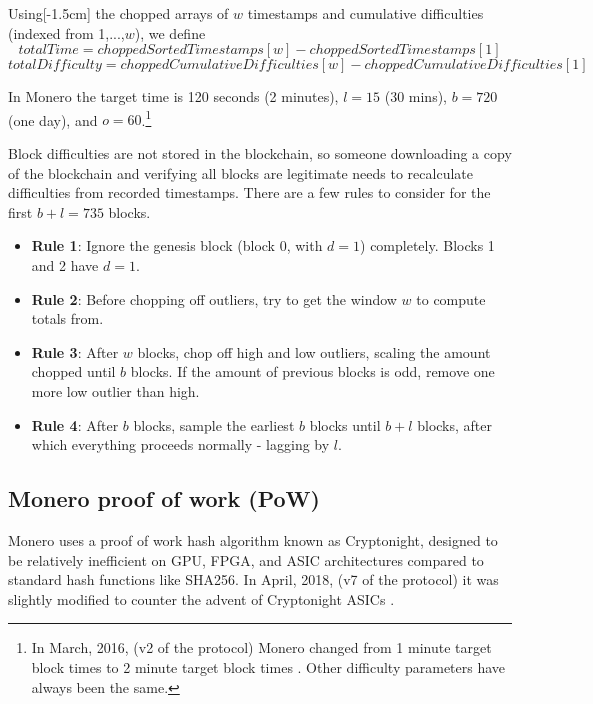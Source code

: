 Using[-1.5cm] the chopped arrays of $w$ timestamps and cumulative difficulties (indexed from 1,...,$w$), we define
\[ \mathit{totalTime} = \mathit{choppedSortedTimestamps}[w] - \mathit{choppedSortedTimestamps}[1]\]
\[ \mathit{totalDifficulty} = \mathit{choppedCumulativeDifficulties}[w] - \mathit{choppedCumulativeDifficulties}[1]\]

In Monero the target time is 120 seconds (2 minutes), $l = 15$ (30 mins), $b = 720$ (one day), and $o = 60$.\footnote{In March, 2016, (v2 of the protocol) Monero changed from 1 minute target block times to 2 minute target block times \cite{monero-0.9.3}. Other difficulty parameters have always been the same.}

Block difficulties are not stored in the blockchain, so someone downloading a copy of the blockchain and verifying all blocks are legitimate needs to recalculate difficulties from recorded timestamps. There are a few rules to consider for the first $b+l = 735$ blocks.

\begin{itemize}
    \item[] \textbf{Rule 1}: Ignore the genesis block (block 0, with $d = 1$) completely. Blocks 1 and 2 have $d = 1$.
    \item[] \textbf{Rule 2}: Before chopping off outliers, try to get the window $w$ to compute totals from.
    \item[] \textbf{Rule 3}: After $w$ blocks, chop off high and low outliers, scaling the amount chopped until $b$ blocks. If the amount of previous blocks is odd, remove one more low outlier than high.
    \item[] \textbf{Rule 4}: After $b$ blocks, sample the earliest $b$ blocks until $b+l$ blocks, after which everything proceeds normally - lagging by $l$.
\end{itemize}


\subsection*{Monero proof of work (PoW)}

Monero uses a proof of work hash algorithm known as Cryptonight, designed to be relatively inefficient on GPU, FPGA, and ASIC architectures \cite{CryptoNight} compared to standard hash functions like SHA256. In April, 2018, (v7 of the protocol) it was slightly modified to counter the advent of Cryptonight ASICs \cite{cryptonight7}.



